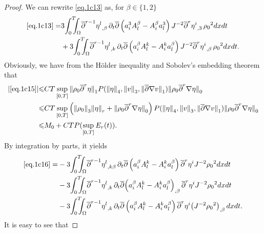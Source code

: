 \documentclass[12pt,twoside,reqno]{amsart}
\numberwithin{equation}{section}
\theoremstyle{definition}
\theoremstyle{remark}
\begin{document}
\begin{proof}
We can rewrite \eqref{eq.1c13} as, for $\beta\in\{1,2\}$
\begin{align}
  \eqref{eq.1c13}=&3{\int_0^T\!\!\!\!\int_\Omega }  {\overline{\partial}}^{r-1}{{{\eta^l}}_{,{\beta}}\,}{\partial}_t{\overline{\partial}} \left(a^3_iA^\beta_l-A^\beta_ia^3_l\right)J^{-2} {{{{\overline{\partial}}^r \eta^i}}_{,{3}}\,}{\rho_0}^2 dxdt\label{eq.1c15}\\
  &+3{\int_0^T\!\!\!\!\int_\Omega }  {\overline{\partial}}^{r-1}{{{\eta^l}}_{,{k}}\,}{\partial}_t{\overline{\partial}} \left(a^\beta_iA^k_l-A^k_ia^\beta_l\right)J^{-2} {{{{\overline{\partial}}^r \eta^i}}_{,{\beta}}\,}{\rho_0}^2 dxdt.\label{eq.1c16}
\end{align}
Obviously, we have from the H\"older inequality and Sobolev's embedding theorem that
\begin{align*}
  {\vert{\eqref{eq.1c15}}\vert}{\leqslant}& CT\sup_{[0,T]}{\Vert{{\rho_0}  {\overline{\partial}}^r\eta}\Vert}_1P({\Vert{\eta}\Vert}_4, {\Vert{v}\Vert}_3,{\Vert{{\overline{\partial}}{\nabla} v}\Vert}_1){\Vert{{\rho_0}  {\overline{\partial}}^r{\nabla}\eta}\Vert}_0\\
  {\leqslant} &CT\sup_{[0,T]}\left({\Vert{\rho_0}\Vert}_3{\Vert{\eta}\Vert}_r +{\Vert{{\rho_0} {\overline{\partial}}^r{\nabla}\eta}\Vert}_0\right)P({\Vert{\eta}\Vert}_4, {\Vert{v}\Vert}_3,{\Vert{{\overline{\partial}}{\nabla} v}\Vert}_1){\Vert{{\rho_0}  {\overline{\partial}}^r{\nabla}\eta}\Vert}_0\\
  {\leqslant}& M_0+CTP(\sup_{[0,T]}E_r(t)).
\end{align*}
By integration by parts, it yields
\begin{align}
  \eqref{eq.1c16}=&-3{\int_0^T\!\!\!\!\int_\Omega }  {\overline{\partial}}^{r-1}{{{\eta^l}}_{,{k\beta}}\,}{\partial}_t{\overline{\partial}} \left(a^\beta_iA^k_l-A^k_ia^\beta_l\right) {\overline{\partial}}^r \eta^i J^{-2}{\rho_0}^2 dxdt\label{eq.1c17}\\
  &-3{\int_0^T\!\!\!\!\int_\Omega }  {\overline{\partial}}^{r-1}{{{\eta^l}}_{,{k}}\,}{\partial}_t{\overline{\partial}} {{{\left(a^\beta_iA^k_l-A^k_ia^\beta_l\right)}}_{,{\beta}}\,} {\overline{\partial}}^r \eta^i J^{-2}{\rho_0}^2 dxdt\label{eq.1c18}\\
  &-3{\int_0^T\!\!\!\!\int_\Omega }  {\overline{\partial}}^{r-1}{{{\eta^l}}_{,{k}}\,}{\partial}_t{\overline{\partial}} \left(a^\beta_iA^k_l-A^k_ia^\beta_l\right) {\overline{\partial}}^r \eta^i {{{\left(J^{-2}{\rho_0}^2 \right)}}_{,{\beta}}\,}dxdt.\label{eq.1c19}
\end{align}
It is easy to see that

\end{proof}
\end{document}

